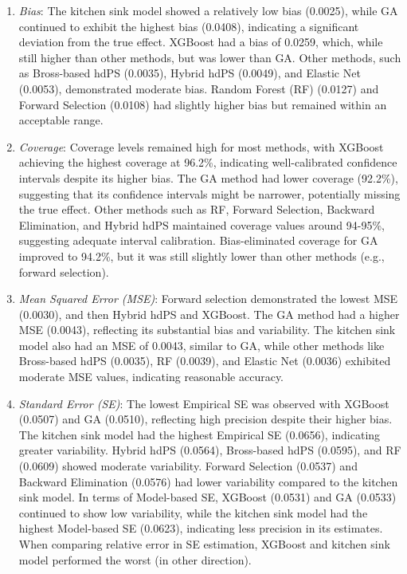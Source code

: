 \documentclass[sn-vancouver,Numbered,lineno,pdflatex]{sn-jnl}
\begin{document}
\begin{enumerate}
\def\labelenumi{\arabic{enumi}.}
\item
  \emph{Bias}: The kitchen sink model showed a relatively low bias
  (0.0025), while GA continued to exhibit the highest bias (0.0408),
  indicating a significant deviation from the true effect. XGBoost had a
  bias of 0.0259, which, while still higher than other methods, but was
  lower than GA. Other methods, such as Bross-based hdPS (0.0035),
  Hybrid hdPS (0.0049), and Elastic Net (0.0053), demonstrated moderate
  bias. Random Forest (RF) (0.0127) and Forward Selection (0.0108) had
  slightly higher bias but remained within an acceptable range.
\item
  \emph{Coverage}: Coverage levels remained high for most methods, with
  XGBoost achieving the highest coverage at 96.2\%, indicating
  well-calibrated confidence intervals despite its higher bias. The GA
  method had lower coverage (92.2\%), suggesting that its confidence
  intervals might be narrower, potentially missing the true effect.
  Other methods such as RF, Forward Selection, Backward Elimination, and
  Hybrid hdPS maintained coverage values around 94-95\%, suggesting
  adequate interval calibration. Bias-eliminated coverage for GA
  improved to 94.2\%, but it was still slightly lower than other methods
  (e.g., forward selection).
\item
  \emph{Mean Squared Error (MSE)}: Forward selection demonstrated the
  lowest MSE (0.0030), and then Hybrid hdPS and XGBoost. The GA method
  had a higher MSE (0.0043), reflecting its substantial bias and
  variability. The kitchen sink model also had an MSE of 0.0043, similar
  to GA, while other methods like Bross-based hdPS (0.0035), RF
  (0.0039), and Elastic Net (0.0036) exhibited moderate MSE values,
  indicating reasonable accuracy.
\item
  \emph{Standard Error (SE)}: The lowest Empirical SE was observed with
  XGBoost (0.0507) and GA (0.0510), reflecting high precision despite
  their higher bias. The kitchen sink model had the highest Empirical SE
  (0.0656), indicating greater variability. Hybrid hdPS (0.0564),
  Bross-based hdPS (0.0595), and RF (0.0609) showed moderate
  variability. Forward Selection (0.0537) and Backward Elimination
  (0.0576) had lower variability compared to the kitchen sink model. In
  terms of Model-based SE, XGBoost (0.0531) and GA (0.0533) continued to
  show low variability, while the kitchen sink model had the highest
  Model-based SE (0.0623), indicating less precision in its estimates.
  When comparing relative error in SE estimation, XGBoost and kitchen
  sink model performed the worst (in other direction).
\end{enumerate}
\end{document}
